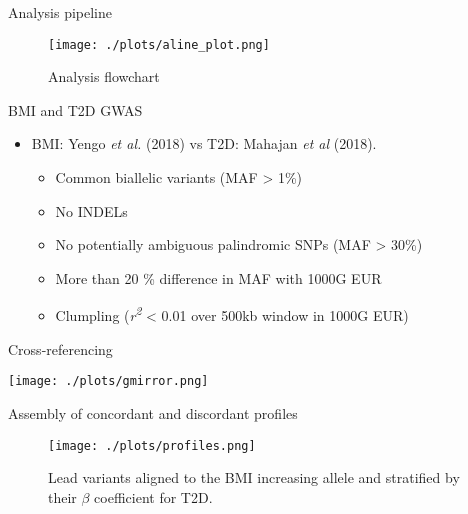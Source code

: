 \documentclass[presentation]{beamer}
\begin{document}
\begin{frame}[label={sec:org5cffd63}]{Analysis pipeline}
\begin{figure}[htbp]
\centering
\texttt{[image: ./plots/aline\_plot.png]}
\caption{Analysis flowchart}
\end{figure}
\end{frame}
\begin{frame}[label={sec:org2b67132}]{BMI and T2D GWAS}
\begin{itemize}
\item BMI: Yengo \emph{et al.} (2018) vs T2D: Mahajan \emph{et al} (2018).
\begin{itemize}
\item Common biallelic variants (MAF > 1\%)
\item No INDELs
\item No potentially ambiguous palindromic SNPs (MAF > 30\%)
\item More than 20 \% difference in MAF with 1000G EUR
\item Clumpling (\emph{r\textsuperscript{2}} < 0.01 over 500kb window in 1000G EUR)
\end{itemize}
\end{itemize}
\end{frame}
\begin{frame}[label={sec:org195db7f}]{Cross-referencing}
\begin{center}
\texttt{[image: ./plots/gmirror.png]}
\end{center}
\end{frame}
\begin{frame}[label={sec:org766d74a}]{Assembly of concordant and discordant profiles}
\begin{figure}[htbp]
\centering
\texttt{[image: ./plots/profiles.png]}
\caption{Lead variants aligned to the BMI increasing allele and stratified by their \(\beta\) coefficient for T2D.}
\end{figure}
\end{frame}
\end{document}
